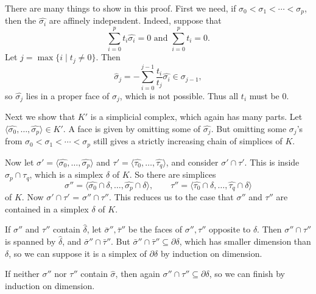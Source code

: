 \documentclass[12pt]{article}
\begin{document}
\begin{proofbox}
	There are many things to show in this proof. First we need, if $\sigma_0 < \sigma_1 < \cdots < \sigma_p$, then the $\hat{\sigma_i}$ are affinely independent. Indeed, suppose that
	\[
		\sum_{i = 0}^p t_i \hat{\sigma_i} = 0 \text{ and } \sum_{i = 0}^p t_i = 0.
	\]
	Let $j = \max\{i \mid t_j \neq 0\}$. Then
	\[
		\hat \sigma_j = - \sum_{i = 0}^{j-1} \frac{t_i}{t_j} \hat{\sigma_i} \in \sigma_{j-1},
	\]
	so $\hat{\sigma_j}$ lies in a proper face of $\sigma_j$, which is not possible. Thus all $t_i$ must be $0$.

	Next we show that $K'$ is a simplicial complex, which again has many parts. Let $\langle \hat{\sigma_0}, \ldots, \hat{\sigma_p}\rangle \in K'$. A face is given by omitting some of $\hat{\sigma_j}$. But omitting some $\sigma_j$'s from $\sigma_0 < \sigma_1 < \cdots < \sigma_p$ still gives a strictly increasing chain of simplices of $K$.

Now let $\sigma' = \langle \hat{\sigma_0}, \ldots, \hat{\sigma_p}\rangle$ and $\tau' = \langle \hat{\tau_0}, \ldots, \hat{\tau_q} \rangle$, and consider $\sigma' \cap \tau'$. This is inside $\sigma_p \cap \tau_q$, which is a simplex $\delta$ of $K$. So there are simplices
\[
	\sigma'' = \langle \hat{\sigma_0} \cap \delta, \ldots, \hat{\sigma_p} \cap \delta \rangle, \qquad \tau'' = \langle \hat{\tau_0} \cap \delta, \ldots, \hat{\tau_q} \cap \delta\rangle
\]
of $K$. Now $\sigma' \cap \tau'$ = $\sigma'' \cap \tau''$. This reduces us to the case that $\sigma''$ and $\tau''$ are contained in a simplex $\delta$ of $K$.

If $\sigma''$ and $\tau''$ contain $\hat \delta$, let $\bar\sigma'', \bar\tau''$ be the faces of $\sigma'', \tau''$ opposite to $\hat{\delta}$. Then $\sigma'' \cap \tau''$ is spanned by $\hat \delta$, and $\bar\sigma'' \cap \bar\tau'' $. But $\bar\sigma'' \cap \bar\tau'' \subseteq \partial \delta$, which has smaller dimension than $\delta$, so we can suppose it is a simplex of $\partial \delta$ by induction on dimension.

If neither $\sigma''$ nor $\tau''$ contain $\hat \sigma$, then again $\sigma'' \cap \tau'' \subseteq \partial \delta$, so we can finish by induction on dimension.


\end{proofbox}
\end{document}
